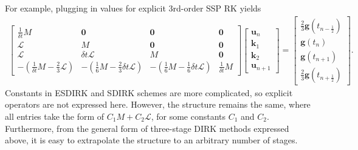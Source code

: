 \documentclass[a4paper,10pt]{article}
\begin{document}
For example, plugging in values for explicit 3rd-order SSP RK yields
\begin{align*}
\begin{bmatrix} \tfrac{1}{\delta t}M & \mathbf{0}  & \mathbf{0} & \mathbf{0}  \\
	\mathcal{L} & M & \mathbf{0} & \mathbf{0} \\
	\mathcal{L} & \delta t \mathcal{L} & M & \mathbf{0} \\
	-\left(\tfrac{1}{\delta t}M - \tfrac{2}{3}\mathcal{L}\right) & -\left(\tfrac{1}{6}M  - \tfrac{2}{3}\delta t\mathcal{L}\right) &
	-\left(\tfrac{1}{6}M  - \tfrac{1}{6}\delta t \mathcal{L}\right) & \tfrac{1}{\delta t}M \end{bmatrix}
	\begin{bmatrix} \mathbf{u}_n \\ \mathbf{k}_1 \\ \mathbf{k}_2 \\ \mathbf{u}_{n+1} \end{bmatrix} =
	\begin{bmatrix} \tfrac{2}{3}\mathbf{g}(t_{n-\frac{1}{2}}) \\ \mathbf{g}(t_{n}) \\ \mathbf{g}(t_{n+1}) \\ \tfrac{2}{3}\mathbf{g}(t_{n+\frac{1}{2}}) \end{bmatrix}.
\end{align*}
%
Constants in ESDIRK and SDIRK schemes are more complicated, so explicit operators are not expressed here.
However, the structure remains the same, where all entries take the form of $C_1M + C_2\mathcal{L}$, for
some constants $C_1$ and $C_2$. Furthermore, from the general form of three-stage DIRK methods
expressed above, it is easy to extrapolate the structure to an arbitrary number of stages.


\end{document}
